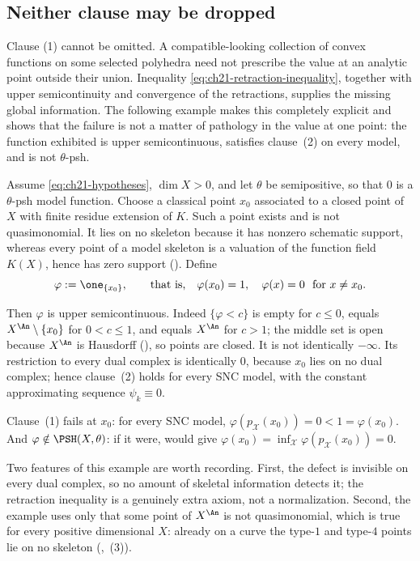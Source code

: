 \subsection{Neither clause may be dropped}
\label{sec:ch21-clauses-independent}

Clause (1) cannot be omitted.  A compatible-looking collection of convex
functions on some selected polyhedra need not prescribe the value at an
analytic point outside their union.  Inequality
\eqref{eq:ch21-retraction-inequality}, together with upper
semicontinuity and convergence of the retractions, supplies the missing
global information.  The following example makes this completely explicit
and shows that the failure is not a matter of pathology in the value at one
point: the function exhibited is upper semicontinuous, satisfies clause~(2)
on every model, and is not $\theta$-psh.

\begin{example}
\label{ex:ch21-clause-one-needed}
Assume \eqref{eq:ch21-hypotheses}, $\dim X>0$, and let $\theta$ be
semipositive, so that $0$ is a $\theta$-psh model function.  Choose a
classical point $x_0$ associated to a closed point of $X$ with finite
residue extension of $K$.  Such a point exists and is not quasimonomial.  It lies on no
skeleton because it has nonzero schematic support, whereas every point of a
model skeleton is a valuation of the function field $K(X)$, hence has
zero support
().
Define
\[
 \varphi:=\one_{\{x_0\}},
 \qquad\text{that is,}\quad
 \varphi(x_0)=1,\quad \varphi(x)=0\ \text{ for }x\neq x_0 .
\]

Then $\varphi$ is upper semicontinuous.  Indeed $\{\varphi<c\}$ is empty
for $c\leq0$, equals $X^{\An}\setminus\{x_0\}$ for $0<c\leq1$, and
equals $X^{\An}$ for $c>1$; the middle set is open because $X^{\An}$ is
Hausdorff (), so points are closed.  It is not
identically $-\infty$.  Its restriction to every dual complex is
identically $0$, because $x_0$ lies on no dual complex; hence
clause~(2) holds for every SNC model, with the constant approximating
sequence $\psi_k\equiv0$.

Clause~(1) fails at $x_0$: for every SNC model,
$\varphi(p_{\mathcal X}(x_0))=0<1=\varphi(x_0)$.  And $\varphi\notin
\PSH(X,\theta)$: if it were, 
would give $\varphi(x_0)=\inf_{\mathcal X}\varphi(p_{\mathcal X}(x_0))=0$.

Two features of this example are worth recording.  First, the defect is
invisible on every dual complex, so no amount of skeletal information
detects it; the retraction inequality is a genuinely extra axiom, not a
normalization.  Second, the example uses only that some point of
$X^{\An}$ is not quasimonomial, which is true for every positive
dimensional $X$: already on a curve the type-$1$ and type-$4$ points
lie on no skeleton (,
\,(3)).
\end{example}


